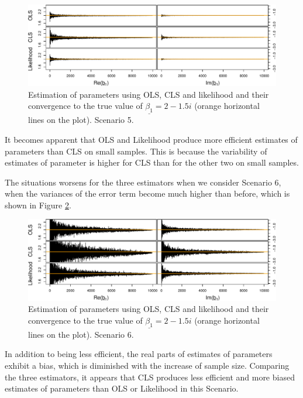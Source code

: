 \documentclass[
]{book}
\begin{document}
\begin{figure}
\centering
\includegraphics{Svetunkov---Svetunkov---Complex-Valued-Econometrics_files/figure-latex/parametersCorError-1.pdf}
\caption{\label{fig:parametersCorError}Estimation of parameters using OLS, CLS and likelihood and their convergence to the true value of \(\underline{\beta_1}=2-1.5i\) (orange horizontal lines on the plot). Scenario 5.}
\end{figure}

It becomes apparent that OLS and Likelihood produce more efficient estimates of parameters than CLS on small samples. This is because the variability of estimates of parameter is higher for CLS than for the other two on small samples.

The situations worsens for the three estimators when we consider Scenario 6, when the variances of the error term become much higher than before, which is shown in Figure \ref{fig:parametersHVError}.

\begin{figure}
\centering
\includegraphics{Svetunkov---Svetunkov---Complex-Valued-Econometrics_files/figure-latex/parametersHVError-1.pdf}
\caption{\label{fig:parametersHVError}Estimation of parameters using OLS, CLS and likelihood and their convergence to the true value of \(\underline{\beta_1}=2-1.5i\) (orange horizontal lines on the plot). Scenario 6.}
\end{figure}

In addition to being less efficient, the real parts of estimates of parameters exhibit a bias, which is diminished with the increase of sample size. Comparing the three estimators, it appears that CLS produces less efficient and more biased estimates of parameters than OLS or Likelihood in this Scenario.
\end{document}
